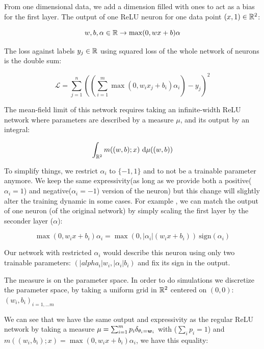 From one dimensional data, we add a dimension filled with ones to act as a bias for the first layer. The output of one ReLU neuron for one data point $(x, 1) \in \mathbb{R}^2$:

\begin{equation}
	w, b, \alpha \in \mathbb{R} \rightarrow \max(0, w x + b) \alpha
\end{equation}

The loss against labels $y_j \in \mathbb{R}$ using squared loss of the whole network of neurons is the double sum:

\begin{equation}
	 \mathcal{L} = \sum_{j=1}^n \left(\left(\sum_{i=1}^m \max(0, w_i x_j + b_i) \alpha_i \right)  - y_j \right)^2
\end{equation}

The mean-field limit of this network requires taking an infinite-width ReLU network where parameters are described by a measure $\mu$, and its output by an integral:

\begin{equation}
	\int_{\mathbb{R}^2} m((w, b); x) ~ \mathrm{d} \mu((w, b))
\end{equation}
 
To simplify things, we restrict $\alpha_i$ to $\{-1, 1\}$ and to not be a trainable parameter anymore. We keep the same expressivity(as long as we provide both a positive($\alpha_i=1$) and negative($\alpha_i=-1$) version of the neuron) but this change will slightly alter the training dynamic in some cases. For example , we can match the output of one neuron (of the original network) by simply scaling the first layer by the seconder layer ($\alpha$):

\begin{equation}
	\max(0, w_i x + b_i) \alpha_i = \max\left(0, |\alpha_i|(w_i x + b_i)\right) \ \text{sign}(\alpha_i)
\end{equation}

Our network with restricted $\alpha_i$ would describe this neuron using only two trainable parameters: $(|alpha_i| w_i, |\alpha_i| b_i)$ and fix its sign in the output.

The measure is on the parameter space. In order to do simulations we discretize the parameter space, by taking a uniform grid in $\mathbb{R}^2$ centered on $(0, 0)$: $(w_i, b_i)_{i=1, \dots m}$

We can see that we have the same output and expressivity as the regular ReLU network by taking a measure $\mu = \sum_{i=1}^{m} p_i \delta_{\theta_i = {\bm{w}}_i}$ with ($\sum_i p_i=1$) and $m((w_i, b_i); x) = \max(0, w_i x + b_i) \alpha_i$, we have this equality:

